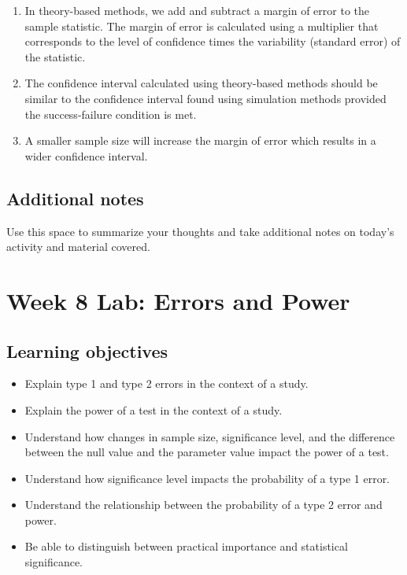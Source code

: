 \documentclass[
]{report}
\begin{document}
\begin{enumerate}
\def\labelenumi{\arabic{enumi}.}
\item
  In theory-based methods, we add and subtract a margin of error to the sample statistic. The margin of error is calculated using a multiplier that corresponds to the level of confidence times the variability (standard error) of the statistic.
\item
  The confidence interval calculated using theory-based methods should be similar to the confidence interval found using simulation methods provided the success-failure condition is met.
\item
  A smaller sample size will increase the margin of error which results in a wider confidence interval.
\end{enumerate}

\hypertarget{additional-notes-12}{%
\subsection{Additional notes}\label{additional-notes-12}}

Use this space to summarize your thoughts and take additional notes on today's activity and material covered.

\newpage

\hypertarget{week-8-lab-errors-and-power}{%
\section{Week 8 Lab: Errors and Power}\label{week-8-lab-errors-and-power}}


\hypertarget{learning-objectives-11}{%
\subsection{Learning objectives}\label{learning-objectives-11}}

\begin{itemize}
\item
  Explain type 1 and type 2 errors in the context of a study.
\item
  Explain the power of a test in the context of a study.
\item
  Understand how changes in sample size, significance level, and the difference between the null value and the parameter value impact the power of a test.
\item
  Understand how significance level impacts the probability of a type 1 error.
\item
  Understand the relationship between the probability of a type 2 error and power.
\item
  Be able to distinguish between practical importance and statistical significance.
\end{itemize}
\end{document}
